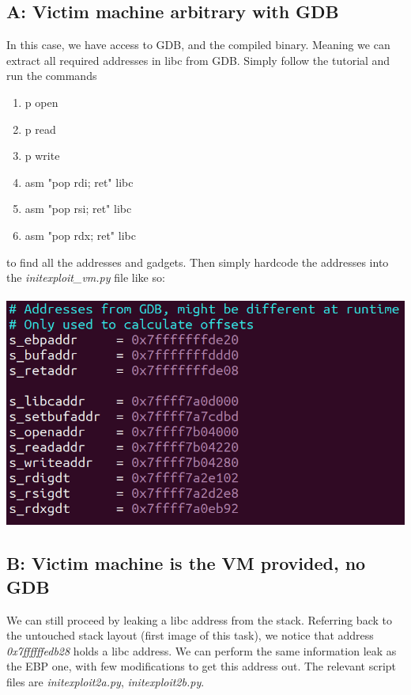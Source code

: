 \documentclass[12pt]{article}
\begin{document}
\subsection*{A: Victim machine arbitrary with GDB}
In this case, we have access to GDB, and the compiled binary.
Meaning we can extract all required addresses in libc from GDB.
Simply follow the tutorial and run the commands
\begin{enumerate}
    \item p open
    \item p read
    \item p write
    \item asm "pop rdi; ret" libc
    \item asm "pop rsi; ret" libc
    \item asm "pop rdx; ret" libc
\end{enumerate}
to find all the addresses and gadgets. Then simply hardcode the addresses into the \emph{initexploit\_vm.py} file like so:\\\\
\includegraphics[scale=0.7]{./a2/rop/hclibc.PNG}\\

\newpage
\subsection*{B: Victim machine is the VM provided, no GDB}
We can still proceed by leaking a libc address from the stack.
Referring back to the untouched stack layout (first image of this task), we notice that address \emph{0x7ffffffedb28} holds a libc address.
We can perform the same information leak as the EBP one, with few modifications to get this address out.
The relevant script files are \emph{initexploit2a.py}, \emph{initexploit2b.py}.\\\\
\end{document}

